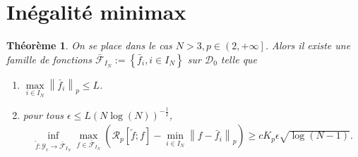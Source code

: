 \documentclass[11pt,letterpaper]{article}
\newtheorem{theorem}{Théorème}
\begin{document}
\section{Inégalité minimax}

\begin{theorem}
\par On se place dans le cas $N > 3, p \in \left(2, +\infty\right]$. Alors il existe une famille de fonctions $\bar{\mathcal{F}}_{I_N} := \left\lbrace \bar{f}_i, i \in I_N \right\rbrace$ sur $\mathcal{D}_0$ telle que 
\begin{enumerate}[label=(\roman*)]
\item $\max\limits_{i \in I_N} \left\| \bar{f}_i \right\|_p \leq L $.
\item pour tous $\epsilon \leq L \left( N \log \left( N \right) \right)^{-\frac{1}{2}}$, 
\begin{equation}
	\begin{split}
		\inf\limits_{\tilde{f}: \mathcal{Y}_\epsilon \to \bar{\mathcal{F}}_{I_N} } \max\limits_{f \in \bar{\mathcal{F}}_{I_N}} \left( \mathcal{R}_p \left[ \tilde{f}; f \right] - \min\limits_{i \in I_N} \left\| f - \bar{f}_i \right\|_p \right) \geq c K_p \epsilon \sqrt{\log \left( N - 1 \right)} .
	\end{split}
\end{equation}

\end{enumerate}
\end{theorem}
\end{document}
